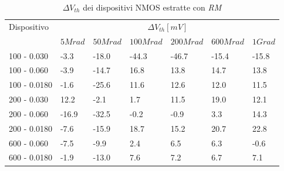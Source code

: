 \begin{table}[H]
  \renewcommand{\arraystretch}{1.3}
  \begin{tabular}{m{2.1cm}  m{1.1cm} m{1.3cm} m{1.5cm} m{1.5cm} m{1.5cm} m{1cm}}
    \toprule
    \multirow{2}{*}{Dispositivo} & \multicolumn{6}{c}{$\Delta V_{th} [mV] $}                                                          \\
    \cmidrule{2-7}
                                 & $5Mrad$                                   & $50Mrad$ & $100Mrad$ & $200Mrad$ & $600Mrad$ & $1Grad$ \\
    \midrule
    100 - 0.030                     & -3.3                                      & -18.0    & -44.3     & -46.7     & -15.4     & -15.8        \\
    \hline
    100 - 0.060                     & -3.9                                      & -14.7    & 16.8      & 13.8      & 14.7      & 13.8        \\
    \hline
    100 - 0.0180                    & -1.6                                      & -25.6    & 11.6      & 12.6      & 12.0      & 11.5        \\
    \hline
    200 - 0.030                     & 12.2                                      & -2.1     & 1.7       & 11.5      & 19.0      & 12.1        \\
    \hline
    200 - 0.060                     & -16.9                                     & -32.5    & -0.2      & -0.9      & 3.3       & 14.3        \\
    \hline
    200 - 0.0180                    & -7.6                                      & -15.9    & 18.7      & 15.2      & 20.7      & 22.8        \\
    \hline
    600 - 0.060                     & -7.5                                      & -9.9     & 2.4       & 6.5       & 6.3       & -0.6        \\
    \hline
    600 - 0.0180                    & -1.9                                      & -13.0    & 7.6       & 7.2       & 6.7       & 7.1        \\
    \bottomrule
  \end{tabular}
  \caption{$\Delta V_{th}$ dei dispositivi NMOS estratte con \emph{RM}}
  \label{tab:deltaVthRMN}
\end{table}

